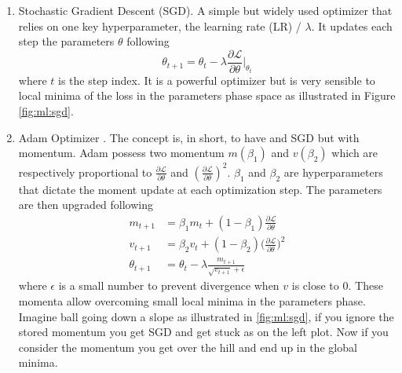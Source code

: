 \documentclass[../main.tex]{subfiles}
\begin{document}
\begin{enumerate}
  \item Stochastic Gradient Descent (SGD).
    A simple but widely used optimizer that relies on one key hyperparameter, the learning rate (LR) / $\lambda$. It updates each step the parameters $\theta$ following
    \begin{equation}
      \theta_{t+1} = \theta_t - \lambda \frac{\partial \mathcal{L}}{\partial \theta}\bigg|_{\theta_t}
    \end{equation}
    where $t$ is the step index. It is a powerful optimizer but is very sensible to local minima of the loss in the parameters phase space as illustrated in Figure \ref{fig:ml:sgd}.

  \item Adam Optimizer \cite{kingma_adam_2017}. The concept is, in short, to have and SGD but with momentum. Adam possess two momentum $m(\beta_1)$ and $v(\beta_2)$ which are respectively proportional to $\frac{\partial \mathcal{L}}{\partial \theta}$ and $(\frac{\partial \mathcal{L}}{\partial \theta})^2$. $\beta_1$ and $\beta_2$ are hyperparameters that dictate the moment update at each optimization step. The parameters are then upgraded following \begin{align}
      m_{t+1} &= \beta_1 m_t + (1 - \beta_1) \frac{\partial \mathcal{L}}{\partial \theta} \\
      v_{t+1} &= \beta_2 v_t + (1 - \beta_2) \bigg(\frac{\partial \mathcal{L}}{\partial \theta}\bigg)^2 \\
      \theta_{t+1} &= \theta_{t} - \lambda \frac{m_{t+1}}{\sqrt{v_{t+1}} + \epsilon}
    \end{align}
    where $\epsilon$ is a small number to prevent divergence when $v$ is close to 0. These momenta allow overcoming small local minima in the parameters phase. Imagine ball going down a slope as illustrated in \ref{fig:ml:sgd}, if you ignore the stored momentum you get SGD and get stuck as on the left plot. Now if you consider the momentum you get over the hill and end up in the global minima.
\end{enumerate}
\end{document}

